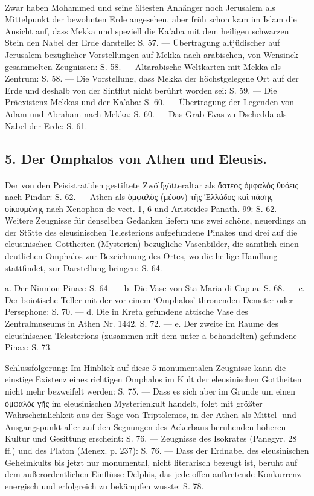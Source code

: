 \documentclass[a4paper, 11pt, oneside]{article}
\begin{document}
\paragraph{}
Zwar haben Mohammed und seine ältesten Anhänger noch Jerusalem als Mittelpunkt der bewohnten Erde angesehen, aber früh schon kam im Islam die Ansicht auf, dass Mekka und speziell die Ka'aba mit dem heiligen schwarzen Stein den Nabel der Erde darstelle: S. 57. --- Übertragung altjüdischer auf Jerusalem bezüglicher Vorstellungen auf Mekka nach arabischen, von Wensinck gesammelten Zeugnissen: S. 58. --- Altarabische Weltkarten mit Mekka als Zentrum: S. 58. --- Die Vorstellung, dass Mekka der höchstgelegene Ort auf der Erde und deshalb von der Sintflut nicht berührt worden sei: S. 59. --- Die Präexistenz Mekkas und der Ka'aba: S. 60. --- Übertragung der Legenden von Adam und Abraham nach Mekka: S. 60. --- Das Grab Evas zu Dschedda als Nabel der Erde: S. 61.

\subsection*{5. Der Omphalos von Athen und Eleusis.}
\paragraph{}
Der von den Peisistratiden gestiftete Zwölfgötteraltar als ἄστεος ὀμφαλὸς θυόεις nach Pindar: S. 62. --- Athen als ὀμφαλὸς (μέσον) τῆς Ἐλλάδος καὶ πάσης οἰκουμένης nach Xenophon de vect. 1, 6 und Aristeides Panath. 99: S. 62. --- Weitere Zeugnisse für denselben Gedanken liefern uns zwei schöne, neuerdings an der Stätte des eleusinischen Telesterions aufgefundene Pinakes und drei auf die eleusinischen Gottheiten (Mysterien) bezügliche Vasenbilder, die sämtlich einen deutlichen Omphalos zur Bezeichnung des Ortes, wo die heilige Handlung stattfindet, zur Darstellung bringen: S. 64.

a. Der Ninnion-Pinax: S. 64. --- b. Die Vase von Sta Maria di Capua: S. 68. --- c. Der boiotische Teller mit der vor einem `Omphalos' thronenden Demeter oder Persephone: S. 70. --- d. Die in Kreta gefundene attische Vase des Zentralmuseums in Athen Nr. 1442. S. 72. --- e. Der zweite im Raume des eleusinischen Telesterions (zusammen mit dem unter a behandelten) gefundene Pinax: S. 73.

Schlussfolgerung: Im Hinblick auf diese 5 monumentalen Zeugnisse kann die einstige Existenz eines richtigen Omphalos im Kult der eleusinischen Gottheiten nicht mehr bezweifelt werden: S. 75. --- Dass es sich aber im Grunde um einen ὀμφαλὸς γῆς im eleusinischen Mysterienkult handelt, folgt mit größter Wahrscheinlichkeit aus der Sage von Triptolemos, in der Athen als Mittel- und Ausgangspunkt aller auf den Segnungen des Ackerbaus beruhenden höheren Kultur und Gesittung erscheint: S. 76. --- Zeugnisse des Isokrates (Panegyr. 28 ff.) und des Platon (Menex. p. 237): S. 76. --- Dass der Erdnabel des eleusinischen Geheimkults bis jetzt nur monumental, nicht literarisch bezeugt ist, beruht auf dem außerordentlichen Einflüsse Delphis, das jede offen auftretende Konkurrenz energisch und erfolgreich zu bekämpfen wusste: S. 78.
\end{document}
